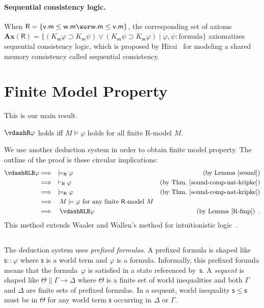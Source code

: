 \documentclass[doctor]{iscs-thesis}
\begin{document}
\paragraph{Sequential consistency logic.}
When $\mathsf R=\{\mathsf v.\mathsf m\le\mathsf w.\mathsf m\wor \mathsf
w.\mathsf m\le \mathsf v.\mathsf m\}$,
the corresponding set of axioms
$\mathbf{Ax}(\mathsf R) = \{(K_{\mathsf m}\varphi\supset K_{\mathsf
m}\psi)\vee(K_{\mathsf m}\psi\supset K_{\mathsf m}\varphi)\mid \varphi,
\psi\colon\mbox{formula}\}$
 axiomatizes sequential consistency logic,
which is proposed by Hirai~\cite{lpar-hirai} for modeling a shared memory consistency called sequential consistency.


\section{Finite Model Property}
\label{fmp-proof}

This is our main result.
\begin{theorem}
 \label{fmp}
 $\vdashR\varphi$ holds iff $M\models \varphi$ holds
 for all finite {\sf R}-model $M$.
\end{theorem}

We use another deduction system\,\LB\,in order to obtain finite model
property.
The outline of the proof is these circular implications:
\begin{align*}
 \vdashRLB\varphi &\Longrightarrow \quad \models_{\mathsf R}\varphi\quad
 &(\mbox{by Lemma~\ref{sound}})\\
 &\Longrightarrow \quad \vdash_{\mathsf R}\varphi &(\mbox{by
 Thm.~\ref{sound-comp-nat-kripke}}) \\
 &\Longrightarrow\quad \modelsR\varphi &\mbox{(by Thm.~\ref{sound-comp-nat-kripke})}\\
 &\Longrightarrow\quad M\models\varphi \mbox{ for any finite $\mathsf
 R$-model }M\\
 &\Longrightarrow\quad \vdashRLB\varphi & (\mbox{by
 Lemma~\ref{R-fmp}})\enspace .
\end{align*}
This method extends Waaler
and Wallen's method for intuitionistic logic~\cite{waaler1999tableaux}.

\subsection{\LB}

The deduction system\,\LB\,uses \textit{prefixed formulas}.  A
prefixed formula is shaped like $\mathsf s::\varphi$ where $\mathsf s $
is a world term and $\varphi$ is a formula.
Informally, this prefixed formula means that the formula~$\varphi$ is
satisfied in a state referenced by~$\mathsf s$.
A \textit{sequent} is shaped like
  $\Theta\parallel \Gamma\longrightarrow \Delta$ where
$\Theta$ is a finite set of world inequalities and both
$\Gamma$ and $\Delta$ are finite sets of prefixed formulas.
In a sequent, world inequality
$\mathsf s\le \mathsf s$ must be in $\Theta$
 for any world term $\mathsf s$ occurring in $\Delta$ or $\Gamma$.
\end{document}
